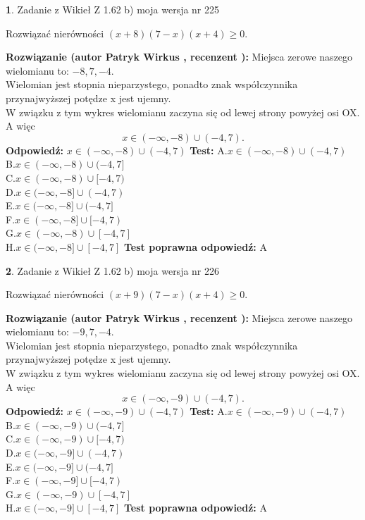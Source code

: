 \documentclass[12pt, a4paper]{article}
\theoremstyle{definition} %
\newtheorem{zad}{}
\newcommand{\zadStart}[1]{\begin{zad}#1\newline}
\newcommand{\zadStop}{\end{zad}}
\newcommand{\rozwStart}[2]{\noindent \textbf{Rozwiązanie (autor #1 , recenzent #2): }\newline}
\newcommand{\rozwStop}{\newline}
\newcommand{\odpStart}{\noindent \textbf{Odpowiedź:}\newline}
\newcommand{\odpStop}{\newline}
\newcommand{\testStart}{\noindent \textbf{Test:}\newline}
\newcommand{\testStop}{\newline}
\newcommand{\kluczStart}{\noindent \textbf{Test poprawna odpowiedź:}\newline}
\newcommand{\kluczStop}{\newline}
\begin{document}
\zadStart{Zadanie z Wikieł Z 1.62 b) moja wersja nr 225}

Rozwiązać nierówności $(x+8)(7-x)(x+4)\ge0$.
\zadStop
\rozwStart{Patryk Wirkus}{}
Miejsca zerowe naszego wielomianu to: $-8, 7, -4$.\\
Wielomian jest stopnia nieparzystego, ponadto znak współczynnika przy\linebreak najwyższej potędze x jest ujemny.\\ W związku z tym wykres wielomianu zaczyna się od lewej strony powyżej osi OX. A więc $$x \in (-\infty,-8) \cup (-4,7).$$
\rozwStop
\odpStart
$x \in (-\infty,-8) \cup (-4,7)$
\odpStop
\testStart
A.$x \in (-\infty,-8) \cup (-4,7)$\\
B.$x \in (-\infty,-8) \cup (-4,7]$\\
C.$x \in (-\infty,-8) \cup [-4,7)$\\
D.$x \in (-\infty,-8] \cup (-4,7)$\\
E.$x \in (-\infty,-8] \cup (-4,7]$\\
F.$x \in (-\infty,-8] \cup [-4,7)$\\
G.$x \in (-\infty,-8) \cup [-4,7]$\\
H.$x \in (-\infty,-8] \cup [-4,7]$
\testStop
\kluczStart
A
\kluczStop



\zadStart{Zadanie z Wikieł Z 1.62 b) moja wersja nr 226}

Rozwiązać nierówności $(x+9)(7-x)(x+4)\ge0$.
\zadStop
\rozwStart{Patryk Wirkus}{}
Miejsca zerowe naszego wielomianu to: $-9, 7, -4$.\\
Wielomian jest stopnia nieparzystego, ponadto znak współczynnika przy\linebreak najwyższej potędze x jest ujemny.\\ W związku z tym wykres wielomianu zaczyna się od lewej strony powyżej osi OX. A więc $$x \in (-\infty,-9) \cup (-4,7).$$
\rozwStop
\odpStart
$x \in (-\infty,-9) \cup (-4,7)$
\odpStop
\testStart
A.$x \in (-\infty,-9) \cup (-4,7)$\\
B.$x \in (-\infty,-9) \cup (-4,7]$\\
C.$x \in (-\infty,-9) \cup [-4,7)$\\
D.$x \in (-\infty,-9] \cup (-4,7)$\\
E.$x \in (-\infty,-9] \cup (-4,7]$\\
F.$x \in (-\infty,-9] \cup [-4,7)$\\
G.$x \in (-\infty,-9) \cup [-4,7]$\\
H.$x \in (-\infty,-9] \cup [-4,7]$
\testStop
\kluczStart
A
\kluczStop
\end{document}
